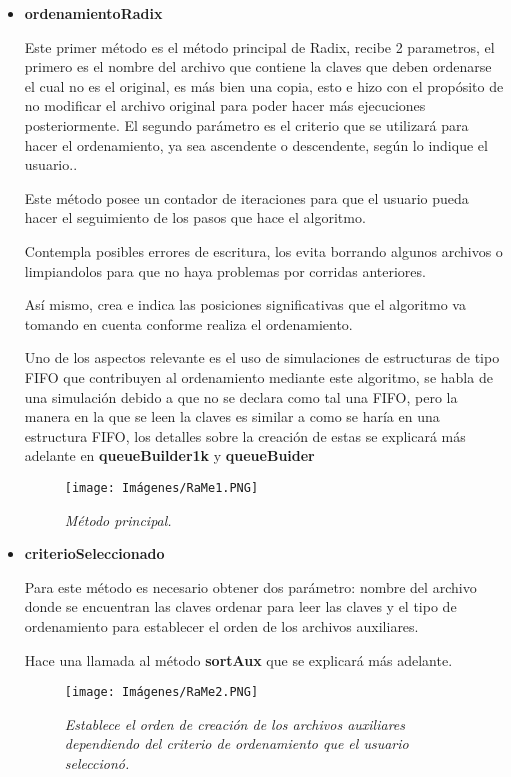 \documentclass[letterpaper,12pt]{extarticle}
\begin{document}
\begin{itemize}
    \item\textbf{ordenamientoRadix}
    
    Este primer método es el método principal de Radix, recibe 2 parametros, el primero es el nombre del archivo que contiene la claves que deben ordenarse el cual no es el original, es más bien una copia, esto e hizo con el propósito de no modificar el archivo original para poder hacer más ejecuciones posteriormente. El segundo parámetro es el criterio que se utilizará para hacer el ordenamiento, ya sea ascendente o descendente, según lo indique el usuario..

    Este método posee un contador de iteraciones para que el usuario pueda hacer el seguimiento de los pasos que hace el algoritmo.
    
    Contempla posibles errores de escritura, los evita borrando algunos archivos o limpiandolos para que no haya problemas por corridas anteriores.
    
    Así mismo, crea e indica las posiciones significativas que el algoritmo va tomando en cuenta conforme realiza el ordenamiento.
    
    Uno de los aspectos relevante es el uso de simulaciones de estructuras de tipo FIFO que contribuyen al ordenamiento mediante este algoritmo, se habla de una simulación debido a que no se declara como tal una FIFO, pero la manera en la que se leen la claves es similar a como se haría en una estructura FIFO, los detalles sobre la creación de estas se explicará más adelante en \textbf {queueBuilder1k} y \textbf {queueBuider}
    
    \begin{figure}[h!]
    \centering
    \texttt{[image: Imágenes/RaMe1.PNG]}
    \caption{\textit{Método principal.}}
    \label{fig:RaMe1}
    \end{figure}
    
    \item\textbf{criterioSeleccionado}
    
    Para este método es necesario obtener dos parámetro: nombre del archivo donde se encuentran las claves ordenar para leer las claves y el tipo de ordenamiento para establecer el orden de los archivos auxiliares.

    Hace una llamada al método \textbf {sortAux} que se explicará más adelante.

    
    \begin{figure}[h!]
    \centering
    \texttt{[image: Imágenes/RaMe2.PNG]}
    \caption{\centering\textit{Establece el orden de creación de los archivos auxiliares dependiendo del criterio de ordenamiento que el usuario seleccionó.}}
    \label{fig:RaMe2}
    \end{figure}
    

\end{itemize}
\end{document}
